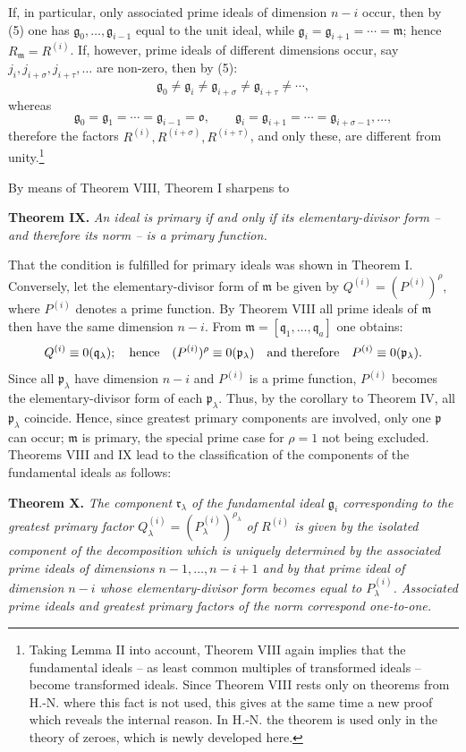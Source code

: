 \documentclass[11pt]{article}
\providecommand{\frakm}{\mathfrak m}
\providecommand{\frakp}{\mathfrak p}
\providecommand{\frakq}{\mathfrak q}
\providecommand{\frakr}{\mathfrak r}
\providecommand{\frakg}{\mathfrak g}
\providecommand{\frako}{\mathfrak o}
\providecommand{\frako}{\mathfrak o}
\providecommand{\frakp}{\mathfrak p}
\providecommand{\frakp}{\mathfrak p}
\providecommand{\frakq}{\mathfrak q}
\providecommand{\frakr}{\mathfrak r}
\begin{document}
If, in particular, only associated prime ideals of dimension $n-i$ occur, then by (5) one has $\frakg_0,\ldots,\frakg_{i-1}$ equal to the unit ideal, while $\frakg_i=\frakg_{i+1}=\cdots=\frakm$; hence $R_\frakm=R^{(i)}$. If, however, prime ideals of different dimensions occur, say $j_i,j_{i+\sigma},j_{i+\tau},\ldots$ are non-zero, then by (5):
\[
 \frakg_0\ne\frakg_i\ne\frakg_{i+\sigma}\ne\frakg_{i+\tau}\ne\cdots,
\]
whereas
\[
 \frakg_0=\frakg_1=\cdots=\frakg_{i-1}=\frako,
 \qquad
 \frakg_i=\frakg_{i+1}=\cdots=\frakg_{i+\sigma-1},\ldots,
\]
therefore the factors $R^{(i)},R^{(i+\sigma)},R^{(i+\tau)}$, and only these, are different from unity.\footnote{Taking Lemma II into account, Theorem VIII again implies that the fundamental ideals -- as least common multiples of transformed ideals -- become transformed ideals. Since Theorem VIII rests only on theorems from H.-N. where this fact is not used, this gives at the same time a new proof which reveals the internal reason. In H.-N. the theorem is used only in the theory of zeroes, which is newly developed here.}

By means of Theorem VIII, Theorem I sharpens to

\textbf{Theorem IX.} \emph{An ideal is primary if and only if its elementary-divisor form -- and therefore its norm -- is a primary function.}

That the condition is fulfilled for primary ideals was shown in Theorem I. Conversely, let the elementary-divisor form of $\frakm$ be given by $Q^{(i)}=(P^{(i)})^\rho$, where $P^{(i)}$ denotes a prime function. By Theorem VIII all prime ideals of $\frakm$ then have the same dimension $n-i$. From $\frakm=[\frakq_1,\ldots,\frakq_a]$ one obtains:
\[
 Q^{(i)}\equiv0(\frakq_\lambda);\quad\hbox{hence}\quad
 (P^{(i)})^\rho\equiv0(\frakp_\lambda)\quad\hbox{and therefore}\quad
 P^{(i)}\equiv0(\frakp_\lambda).
\]
Since all $\frakp_\lambda$ have dimension $n-i$ and $P^{(i)}$ is a prime function, $P^{(i)}$ becomes the elementary-divisor form of each $\frakp_\lambda$. Thus, by the corollary to Theorem IV, all $\frakp_\lambda$ coincide. Hence, since greatest primary components are involved, only one $\frakp$ can occur; $\frakm$ is primary, the special prime case for $\rho=1$ not being excluded. Theorems VIII and IX lead to the classification of the components of the fundamental ideals as follows:

\textbf{Theorem X.} \emph{The component $\frakr_\lambda$ of the fundamental ideal $\frakg_i$ corresponding to the greatest primary factor $Q_\lambda^{(i)}=(P_\lambda^{(i)})^{\rho_\lambda}$ of $R^{(i)}$ is given by the isolated component of the decomposition which is uniquely determined by the associated prime ideals of dimensions $n-1,\ldots,n-i+1$ and by that prime ideal of dimension $n-i$ whose elementary-divisor form becomes equal to $P_\lambda^{(i)}$. Associated prime ideals and greatest primary factors of the norm correspond one-to-one.}
\end{document}
